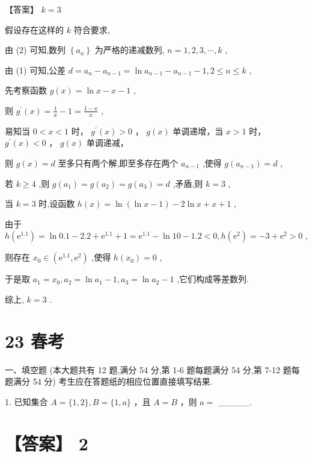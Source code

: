 \documentclass[10pt]{article}
\begin{document}
【答案】 \(k = 3\)

假设存在这样的 \(k\) 符合要求,

由 (2) 可知,数列 \(\left\{  {a}_{n}\right\}\) 为严格的递减数列, \(n = 1,2,3,\cdots ,k\) ,

由 (1) 可知,公差 \(d = {a}_{n} - {a}_{n - 1} = \ln {a}_{n - 1} - {a}_{n - 1} - 1,2 \leq  n \leq  k\) ,

先考察函数 \(g\left( x\right)  = \ln x - x - 1\) ,

则 \({g}^{\prime }\left( x\right)  = \frac{1}{x} - 1 = \frac{1 - x}{x}\) ,

易知当 \(0 < x < 1\) 时， \({g}^{\prime }\left( x\right)  > 0\) ， \(g\left( x\right)\) 单调递增，当 \(x > 1\) 时， \({g}^{\prime }\left( x\right)  < 0\) ， \(g\left( x\right)\) 单调递减，

则 \(g\left( x\right)  = d\) 至多只有两个解,即至多存在两个 \({a}_{n - 1}\) ,使得 \(g\left( {a}_{n - 1}\right)  = d\) ,

若 \(k \geq  4\) ,则 \(g\left( {a}_{1}\right)  = g\left( {a}_{2}\right)  = g\left( {a}_{3}\right)  = d\) ,矛盾,则 \(k = 3\) ,

当 \(k = 3\) 时,设函数 \(h\left( x\right)  = \ln \left( {\ln x - 1}\right)  - 2\ln x + x + 1\) ,

由于 \(h\left( {\mathrm{e}}^{1.1}\right)  = \ln {0.1} - {2.2} + {\mathrm{e}}^{1.1} + 1 = {\mathrm{e}}^{1.1} - \ln {10} - {1.2} < 0,h\left( {\mathrm{e}}^{2}\right)  =  - 3 + {\mathrm{e}}^{2} > 0\) ,

则存在 \({x}_{0} \in  \left( {{\mathrm{e}}^{1.1},{\mathrm{e}}^{2}}\right)\) ,使得 \(h\left( {x}_{0}\right)  = 0\) ,

于是取 \({a}_{1} = {x}_{0},{a}_{2} = \ln {a}_{1} - 1,{a}_{3} = \ln {a}_{2} - 1\) ,它们构成等差数列.

综上, \(k = 3\) .

\section*{23 春考}

一、填空题 (本大题共有 12 题,满分 54 分,第 1-6 题每题满分 54 分,第 7-12 题每题满分 54 分) 考生应在答题纸的相应位置直接填写结果.

1. 已知集合 \(A = \{ 1,2\} ,B = \{ 1,a\}\) ，且 \(A = B\) ，则 \(a =\) \_\_\_\_\_.

\section*{【答案】 2}
\end{document}
